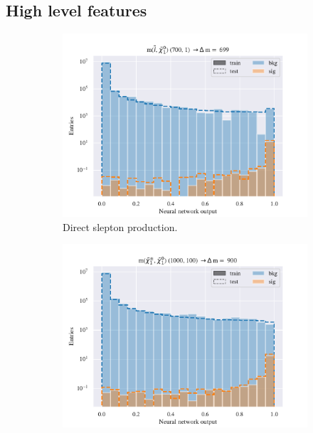 \subsection{High level features}

\begin{figure}[H]
    \centering
    \begin{subfigure}[t!]{0.49\textwidth}
        \includegraphics[width = \textwidth]{Figures/SlepSlep/ML/NN/High_level/High/scaled_train_test_396033.pdf}
        \caption{Direct slepton production.}
        \label{fig:}
    \end{subfigure}
    \begin{subfigure}[t!]{0.49\textwidth}
        \includegraphics[width = \textwidth]{Figures/SlepSnu/NN/High_level/High/scaled_train_test_397169.pdf}

\end{subfigure}
\end{figure}

